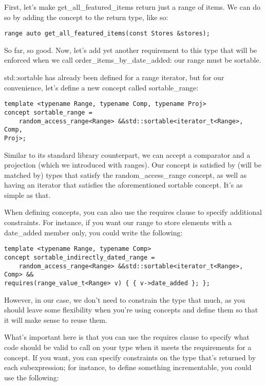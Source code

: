 First, let's make get\_all\_featured\_items return just a range of items. We can do so by adding the concept to the return type, like so:

\begin{lstlisting}[style=styleCXX]
range auto get_all_featured_items(const Stores &stores);
\end{lstlisting}

So far, so good. Now, let's add yet another requirement to this type that will be enforced when we call order\_items\_by\_date\_added: our range must be sortable.

std::sortable has already been defined for a range iterator, but for our convenience, let's define a new concept called sortable\_range:


\begin{lstlisting}[style=styleCXX]
template <typename Range, typename Comp, typename Proj>
concept sortable_range =
	random_access_range<Range> &&std::sortable<iterator_t<Range>, Comp,
Proj>;
\end{lstlisting}

Similar to its standard library counterpart, we can accept a comparator and a projection (which we introduced with ranges). Our concept is satisfied by (will be matched by) types that satisfy the random\_access\_range concept, as well as having an iterator that satisfies the aforementioned sortable concept. It's as simple as that.

When defining concepts, you can also use the requires clause to specify additional constraints. For instance, if you want our range to store elements with a date\_added member only, you could write the following:

\begin{lstlisting}[style=styleCXX]
template <typename Range, typename Comp>
concept sortable_indirectly_dated_range =
	random_access_range<Range> &&std::sortable<iterator_t<Range>, Comp> &&
requires(range_value_t<Range> v) { { v->date_added }; };
\end{lstlisting}

However, in our case, we don't need to constrain the type that much, as you should leave some flexibility when you're using concepts and define them so that it will make sense to reuse them.

What's important here is that you can use the requires clause to specify what code should be valid to call on your type when it meets the requirements for a concept. If you want, you can specify constraints on the type that's returned by each subexpression; for instance, to define something incrementable, you could use the following:

